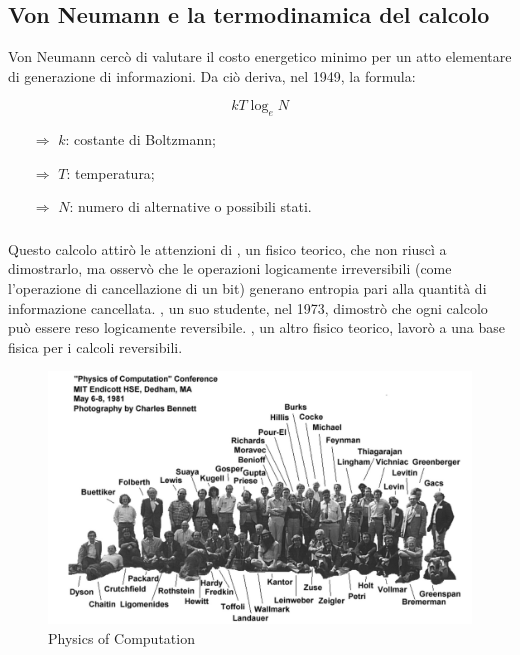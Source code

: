 \subsection{Von Neumann e la termodinamica del calcolo}

Von Neumann cercò di valutare il costo energetico minimo per un
atto elementare di generazione di informazioni. Da ciò deriva, nel 1949,
la formula:

$$kT \log_e N$$

\begin{itemize}
    \item [$\Rightarrow$] $k$: costante di Boltzmann;
    \item [$\Rightarrow$] $T$: temperatura;
    \item [$\Rightarrow$] $N$: numero di alternative o possibili stati.
\end{itemize}
\subsubsection{}
Questo calcolo attirò le attenzioni di , un fisico teorico, 
che non riuscì a dimostrarlo, ma osservò che le operazioni logicamente
irreversibili (come l'operazione di cancellazione di un bit) generano entropia
pari alla quantità di informazione cancellata. , un suo studente,
nel 1973, dimostrò che ogni calcolo può essere reso logicamente reversibile.
, un altro fisico teorico, 
lavorò a una base fisica per i calcoli reversibili.


\begin{figure}[h]
    \centering
    \includegraphics[scale=0.3]{images/Comp.png}
    \caption{Physics of Computation}
\end{figure}

